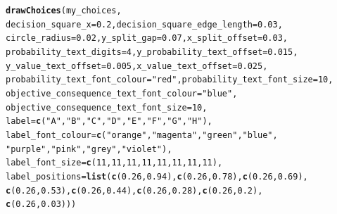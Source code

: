 \documentclass{article}\usepackage[]{graphicx}\usepackage[]{color}
\makeatletter
\newcommand{\hlnum}[1]{\textcolor[rgb]{0.686,0.059,0.569}{#1}}%
\newcommand{\hlstr}[1]{\textcolor[rgb]{0.192,0.494,0.8}{#1}}%
\newcommand{\hlstd}[1]{\textcolor[rgb]{0.345,0.345,0.345}{#1}}%
\newcommand{\hlkwc}[1]{\textcolor[rgb]{0.333,0.667,0.333}{#1}}%
\newcommand{\hlkwd}[1]{\textcolor[rgb]{0.737,0.353,0.396}{\textbf{#1}}}%
\newenvironment{kframe}{%
 \def\at@end@of@kframe{}%
 \ifinner\ifhmode%
  \def\at@end@of@kframe{\end{minipage}}%
  \begin{minipage}{\columnwidth}%
 \fi\fi%
 \def\FrameCommand##1{\hskip\@totalleftmargin \hskip-\fboxsep
 \colorbox{shadecolor}{##1}\hskip-\fboxsep
     \hskip-\linewidth \hskip-\@totalleftmargin \hskip\columnwidth}%
 \MakeFramed {\advance\hsize-\width
   \@totalleftmargin\z@ \linewidth\hsize
   \@setminipage}}%
 {\par\unskip\endMakeFramed%
 \at@end@of@kframe}
\newenvironment{knitrout}{}{} %
\makeatother
\begin{document}
\begin{knitrout}
\begin{kframe}
\begin{verbatim}
\end{verbatim}
\begin{alltt}
\hlkwd{drawChoices}\hlstd{(my_choices,}
        \hlkwc{decision_square_x}\hlstd{=}\hlnum{0.2}\hlstd{,} \hlkwc{decision_square_edge_length}\hlstd{=}\hlnum{0.03}\hlstd{,}
        \hlkwc{circle_radius}\hlstd{=}\hlnum{0.02}\hlstd{,} \hlkwc{y_split_gap}\hlstd{=}\hlnum{0.07}\hlstd{,} \hlkwc{x_split_offset}\hlstd{=}\hlnum{0.03}\hlstd{,}
        \hlkwc{probability_text_digits}\hlstd{=}\hlnum{4}\hlstd{,} \hlkwc{y_probability_text_offset}\hlstd{=}\hlnum{0.015}\hlstd{,}
        \hlkwc{y_value_text_offset}\hlstd{=}\hlnum{0.005}\hlstd{,} \hlkwc{x_value_text_offset}\hlstd{=}\hlnum{0.025}\hlstd{,}
        \hlkwc{probability_text_font_colour}\hlstd{=}\hlstr{"red"}\hlstd{,} \hlkwc{probability_text_font_size}\hlstd{=}\hlnum{10}\hlstd{,}
        \hlkwc{objective_consequence_text_font_colour}\hlstd{=}\hlstr{"blue"}\hlstd{,}
        \hlkwc{objective_consequence_text_font_size}\hlstd{=}\hlnum{10}\hlstd{,}
        \hlkwc{label}\hlstd{=}\hlkwd{c}\hlstd{(}\hlstr{"A"}\hlstd{,}\hlstr{"B"}\hlstd{,}\hlstr{"C"}\hlstd{,}\hlstr{"D"}\hlstd{,}\hlstr{"E"}\hlstd{,}\hlstr{"F"}\hlstd{,}\hlstr{"G"}\hlstd{,}\hlstr{"H"}\hlstd{),}
        \hlkwc{label_font_colour}\hlstd{=}\hlkwd{c}\hlstd{(}\hlstr{"orange"}\hlstd{,}\hlstr{"magenta"}\hlstd{,}\hlstr{"green"}\hlstd{,}\hlstr{"blue"}\hlstd{,}
                \hlstr{"purple"}\hlstd{,}\hlstr{"pink"}\hlstd{,}\hlstr{"grey"}\hlstd{,}\hlstr{"violet"}\hlstd{),}
        \hlkwc{label_font_size}\hlstd{=}\hlkwd{c}\hlstd{(}\hlnum{11}\hlstd{,}\hlnum{11}\hlstd{,}\hlnum{11}\hlstd{,}\hlnum{11}\hlstd{,}\hlnum{11}\hlstd{,}\hlnum{11}\hlstd{,}\hlnum{11}\hlstd{,}\hlnum{11}\hlstd{),}
        \hlkwc{label_positions}\hlstd{=}\hlkwd{list}\hlstd{(}\hlkwd{c}\hlstd{(}\hlnum{0.26}\hlstd{,}\hlnum{0.94}\hlstd{),}\hlkwd{c}\hlstd{(}\hlnum{0.26}\hlstd{,}\hlnum{0.78}\hlstd{),}\hlkwd{c}\hlstd{(}\hlnum{0.26}\hlstd{,}\hlnum{0.69}\hlstd{),}
                \hlkwd{c}\hlstd{(}\hlnum{0.26}\hlstd{,}\hlnum{0.53}\hlstd{),}\hlkwd{c}\hlstd{(}\hlnum{0.26}\hlstd{,}\hlnum{0.44}\hlstd{),}\hlkwd{c}\hlstd{(}\hlnum{0.26}\hlstd{,}\hlnum{0.28}\hlstd{),}\hlkwd{c}\hlstd{(}\hlnum{0.26}\hlstd{,}\hlnum{0.2}\hlstd{),}
                \hlkwd{c}\hlstd{(}\hlnum{0.26}\hlstd{,}\hlnum{0.03}\hlstd{)))}
\end{alltt}
\end{kframe}


\end{knitrout}
\end{document}
